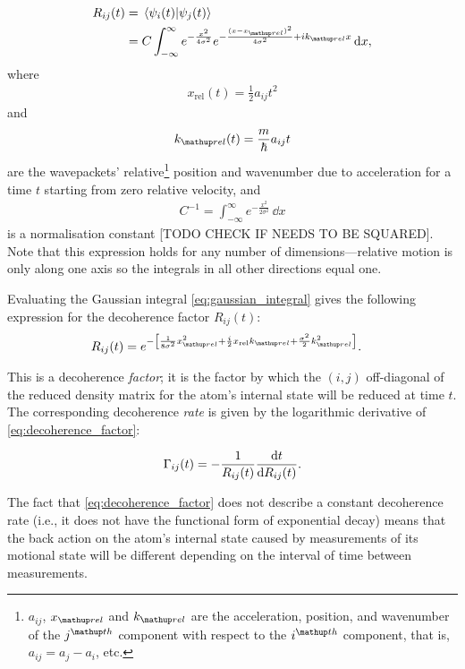 \begin{align}
R_{ij}(t) &= \braket{\psi_i(t)}{\psi_j(t)}\\
 &= C \int_{-\infty}^{\infty} e^{-\frac{x^2}{4\sigma^2}}e^{-\frac{(x-x_\up{rel})^2}{4\sigma^2} + ik_\up{rel}x}\,\dd x,\label{eq:gaussian_integral}
\end{align}
where
\begin{align}
x_{\mathrm{rel}}(t) = \frac12a_{ij}t^2
\end{align}
and
\begin{align}
k_\up{rel}(t) = \frac m \hbar a_{ij} t
\end{align}
are the wavepackets' relative\footnote{$a_{ij}$, $x_\up{rel}$ and $k_\up{rel}$ are the acceleration, position, and wavenumber of the $j^\up{th}$ component with respect to the $i^\up{th}$ component, that is, $a_{ij} = a_j - a_i$, etc.} position and wavenumber due to acceleration for a time $t$ starting from zero relative velocity, and
\begin{align}
C^{-1}=\int_{-\infty}^\infty e^{-\frac{x^2}{2\sigma^2}}\,\dd x\label{supp:eq:Cdef}
\end{align}
is a normalisation constant [TODO CHECK IF NEEDS TO BE SQUARED]. Note that this expression holds for any number of dimensions---relative motion is only along one axis so the integrals in all other directions equal one.

Evaluating the Gaussian integral \eqref{eq:gaussian_integral} gives the following expression for the decoherence factor $R_{ij}(t)$:
\begin{align}
R_{ij}(t)&= e^{-\left[
        \frac{1} {8\sigma^2} x_\up{rel}^2
      + \frac i2 x_{\mathrm{rel}} k_\up{rel}
      + \frac{\sigma^2}{2} k_\up{rel}^2
      \right]}\label{eq:decoherence_factor}.
\end{align}

This is a decoherence \emph{factor}; it is the factor by which the $(i, j)$ off-diagonal of the reduced density matrix for the atom's internal state will be reduced at time $t$. The corresponding decoherence \emph{rate} is given by the logarithmic derivative of \eqref{eq:decoherence_factor}:

\begin{align}
\Gamma_{ij}(t) = - \frac 1 {R_{ij}(t)} \dv t {R_{ij}(t)}.
\end{align}

 The fact that \eqref{eq:decoherence_factor} does not describe a constant decoherence rate (i.e., it does not have the functional form of exponential decay) means that the back action on the atom's internal state caused by measurements of its motional state will be different depending on the interval of time between measurements.

